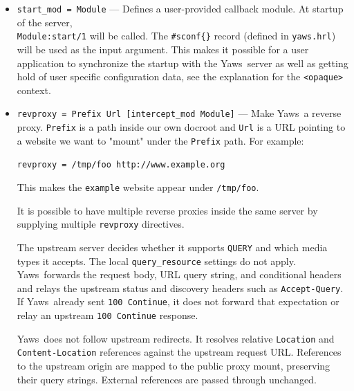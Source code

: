 \documentclass[11pt,oneside,english]{book}
\newcommand{\Yaws}            %
        {{\sc Yaws}}
\begin{document}
\begin{itemize}
              The module \verb+yaws_vdir+ can be used in case you want to serve
              static content that is not located in your docroot. See the
              example at the bottom of this man page for how to use the
              \verb+opaque+ + \verb+vdir+ elements to instruct the
              \verb+yaws_vdir+ module what paths to rewrite.

\item       \verb+start_mod = Module+ ---
              Defines a user-provided callback module. At startup of the server,\\
              \verb+Module:start/1+ will be called.  The \verb+#sconf{}+ record
              (defined in \verb+yaws.hrl+) will be used as the input argument. This
              makes it possible for a user application to synchronize the
              startup with the \Yaws\ server as well as getting hold of user
              specific configuration data, see the explanation for the
              \verb+<opaque>+ context.

\item       \verb+revproxy = Prefix Url [intercept_mod Module]+ ---
              Make \Yaws\ a reverse proxy. \verb+Prefix+ is a path inside our own
              docroot and \verb+Url+ is a URL pointing to a website we
              want to "mount" under the \verb+Prefix+ path. For example:

              \verb+revproxy = /tmp/foo http://www.example.org+

              This makes the \verb+example+ website appear under \verb+/tmp/foo+.

              It is possible to have multiple reverse proxies inside the same
              server by supplying multiple \verb+revproxy+ directives.

              The upstream server decides whether it supports \verb+QUERY+
              and which media types it accepts. The local
              \verb+query_resource+ settings do not apply. \Yaws\ forwards
              the request body, URL query string, and conditional headers
              and relays the upstream status and discovery headers such as
              \verb+Accept-Query+. If \Yaws\ already sent
              \verb+100 Continue+, it does not forward that expectation or
              relay an upstream \verb+100 Continue+ response.

              \Yaws\ does not follow upstream redirects. It resolves
              relative \verb+Location+ and \verb+Content-Location+ references
              against the upstream request URL. References to the upstream
              origin are mapped to the public proxy mount, preserving their
              query strings. External references are passed through unchanged.


\end{itemize}
\end{document}
